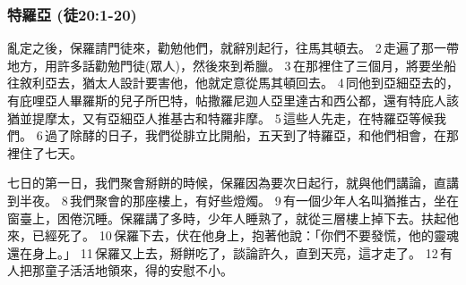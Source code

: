 \subsubsection{特羅亞 (徒20:1-20)}
亂定之後，保羅請門徒來，勸勉他們，就辭別起行，往馬其頓去。 2 走遍了那一帶地方，用許多話勸勉門徒(眾人)，然後來到希臘。 3 在那裡住了三個月，將要坐船往敘利亞去，猶太人設計要害他，他就定意從馬其頓回去。 4 同他到亞細亞去的，有庇哩亞人畢羅斯的兒子所巴特，帖撒羅尼迦人亞里達古和西公都，還有特庇人該猶並提摩太，又有亞細亞人推基古和特羅非摩。 5 這些人先走，在特羅亞等候我們。 6 過了除酵的日子，我們從腓立比開船，五天到了特羅亞，和他們相會，在那裡住了七天。

七日的第一日，我們聚會掰餅的時候，保羅因為要次日起行，就與他們講論，直講到半夜。 8 我們聚會的那座樓上，有好些燈燭。 9 有一個少年人名叫猶推古，坐在窗臺上，困倦沉睡。保羅講了多時，少年人睡熟了，就從三層樓上掉下去。扶起他來，已經死了。 10 保羅下去，伏在他身上，抱著他說：「你們不要發慌，他的靈魂還在身上。」 11 保羅又上去，掰餅吃了，談論許久，直到天亮，這才走了。 12 有人把那童子活活地領來，得的安慰不小。


